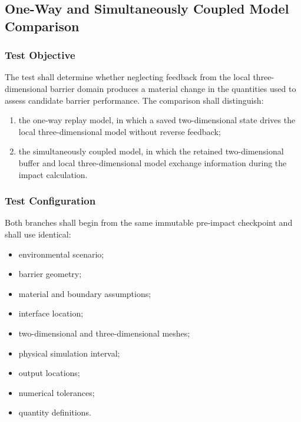 \subsection{One-Way and Simultaneously Coupled Model Comparison}
\label{sec:res-ver-tst-coupling-mode-comparison}

\subsubsection{Test Objective}
\label{sec:res-ver-tst-coupling-mode-objective}

The test shall determine whether neglecting feedback from the local
three-dimensional barrier domain produces a material change in the
quantities used to assess candidate barrier performance. The comparison
shall distinguish:

\begin{enumerate}
  \item the one-way replay model, in which a saved two-dimensional
    state drives the local three-dimensional model without reverse
    feedback;
  \item the simultaneously coupled model, in which the retained
    two-dimensional buffer and local three-dimensional model
    exchange information during the impact calculation.
\end{enumerate}

\subsubsection{Test Configuration}
\label{sec:res-ver-tst-coupling-mode-configuration}

Both branches shall begin from the same immutable pre-impact checkpoint
and shall use identical:

\begin{itemize}
  \item environmental scenario;
  \item barrier geometry;
  \item material and boundary assumptions;
  \item interface location;
  \item two-dimensional and three-dimensional meshes;
  \item physical simulation interval;
  \item output locations;
  \item numerical tolerances;
  \item quantity definitions.
\end{itemize}

